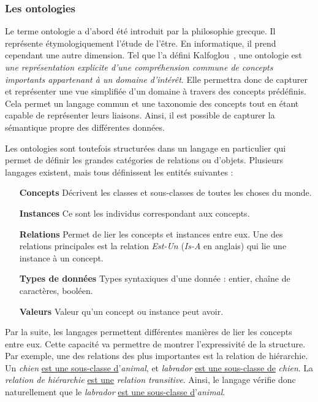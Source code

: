 \subsubsection{Les ontologies}
Le terme ontologie a d'abord été introduit par la philosophie grecque. Il représente étymologiquement l'étude de l'être. En informatique, il prend cependant une autre dimension. Tel que l'a défini Kalfoglou~\cite{Kalfoglou:ontology}, une ontologie est \textit{une représentation explicite d'une compréhension commune de concepts importants appartenant à un domaine d'intérêt}.
Elle permettra donc de capturer et représenter une vue simplifiée d'un domaine à travers des concepts prédéfinis. Cela permet un langage commun et une taxonomie des concepts tout en étant capable de représenter leurs liaisons. Ainsi, il est possible de capturer la sémantique propre des différentes données.

Les ontologies sont toutefois structurées dans un langage en particulier qui permet de définir les grandes catégories de relations ou d'objets. Plusieurs langages existent, mais tous définissent les entités suivantes :
\begin{itemize}
    \item[\textbf{Concepts}] Décrivent les classes et sous-classes de toutes les choses du monde.
    \item[\textbf{Instances}] Ce sont les individus correspondant aux concepts.
    \item[\textbf{Relations}] Permet de lier les concepts et instances entre eux. Une des relations principales est la relation \textit{Est-Un} (\textit{Is-A} en anglais) qui lie une instance à un concept.
    \item[\textbf{Types de données}] Types syntaxiques d'une donnée : entier, chaîne de caractères, booléen.
    \item[\textbf{Valeurs}] Valeur qu'un concept ou instance peut avoir.
\end{itemize}

Par la suite, les langages permettent différentes manières de lier les concepts entre eux. Cette capacité va permettre de montrer l'expressivité de la structure. Par exemple, une des relations des plus importantes est la relation de hiérarchie. Un \textit{chien} \underline{est une sous-classe d}'\textit{animal}, et \textit{labrador} \underline{est une sous-classe de} \textit{chien}. La \textit{relation de hiérarchie} \underline{est une} \textit{relation transitive}. Ainsi, le langage vérifie donc naturellement que le \textit{labrador} \underline{est une sous-classe d}'\textit{animal}. 

